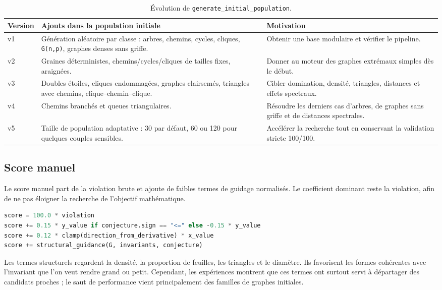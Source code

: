 \documentclass[11pt,a4paper]{article}
\begin{document}
\begin{table}[H]
\centering
\begin{tabular}{p{1.3cm}p{6.2cm}p{6cm}}
\toprule
Version & Ajouts dans la population initiale & Motivation \\
\midrule
v1 & Génération aléatoire par classe : arbres, chemins, cycles, cliques, \texttt{G(n,p)}, graphes denses sans griffe. & Obtenir une base modulaire et vérifier le pipeline. \\
v2 & Graines déterministes, chemins/cycles/cliques de tailles fixes, araignées. & Donner au moteur des graphes extrémaux simples dès le début. \\
v3 & Doubles étoiles, cliques endommagées, graphes clairsemés, triangles avec chemins, clique--chemin--clique. & Cibler domination, densité, triangles, distances et effets spectraux. \\
v4 & Chemins branchés et queues triangulaires. & Résoudre les derniers cas d'arbres, de graphes sans griffe et de distances spectrales. \\
v5 & Taille de population adaptative : 30 par défaut, 60 ou 120 pour quelques couples sensibles. & Accélérer la recherche tout en conservant la validation stricte 100/100. \\
\bottomrule
\end{tabular}
\caption{Évolution de \texttt{generate\_initial\_population}.}
\end{table}

\subsection{Score manuel}

Le score manuel part de la violation brute et ajoute de faibles termes de guidage normalisés. Le coefficient dominant reste la violation, afin de ne pas éloigner la recherche de l'objectif mathématique.

\begin{lstlisting}[language=Python,caption={Forme simplifiée du score manuel.}]
score = 100.0 * violation
score += 0.15 * y_value if conjecture.sign == "<=" else -0.15 * y_value
score += 0.12 * clamp(direction_from_derivative) * x_value
score += structural_guidance(G, invariants, conjecture)
\end{lstlisting}

Les termes structurels regardent la densité, la proportion de feuilles, les triangles et le diamètre. Ils favorisent les formes cohérentes avec l'invariant que l'on veut rendre grand ou petit. Cependant, les expériences montrent que ces termes ont surtout servi à départager des candidats proches ; le saut de performance vient principalement des familles de graphes initiales.
\end{document}
